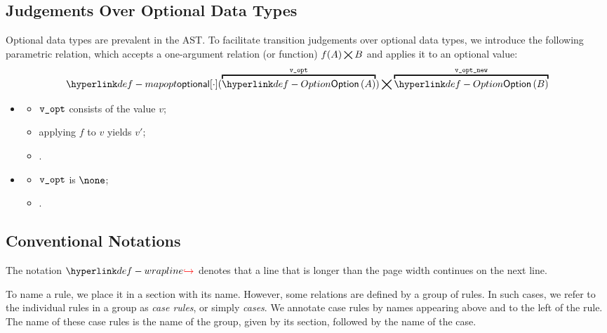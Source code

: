 \subsection{Judgements Over Optional Data Types}
\hypertarget{def-mapopt}{}
Optional data types are prevalent in the AST.
To facilitate transition judgements over optional data types,
we introduce the following parametric relation,
which accepts a one-argument relation (or function) $f(A) \bigtimes B$
and applies it to an optional value:
\[
\mapopt{\cdot}(\overname{\Option{A}}{\vvopt}) \aslrel \overname{\Option{B}}{\vvoptnew}
\]

\ProseParagraph
\OneApplies
\begin{itemize}
  \item {}
  \begin{itemize}
    \item $\texttt{v\_opt}$ consists of the value $v$;
    \item applying $f$ to $v$ yields $v'$;
    \item {}.
  \end{itemize}

  \item {}
  \begin{itemize}
    \item $\texttt{v\_opt}$ is $\none$;
    \item \Proseeqdef{$\vvoptnew$}{$\none$}.
  \end{itemize}
\end{itemize}

\FormallyParagraph
{}

\subsection{Conventional Notations}
\hypertarget{def-wrapline}{}
The notation $\wrappedline$ denotes that a line that is longer than the page width continues on the next line.

To name a rule, we place it in a section with its name.
However, some relations are defined by a group of rules.
In such cases, we refer to the individual rules in a group as \emph{case rules},
or simply \emph{cases}. We annotate case rules by names
appearing above and to the left of the rule. The name of these case rules
is the name of the group, given by its section, followed by the name of the case.

